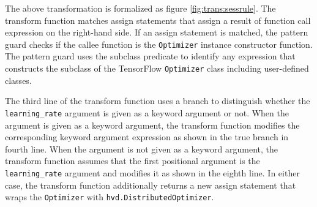 The above transformation is formalized as figure 
\ref{fig:trans:sessrule}. The transform function 
matches assign statements that assign a result of function call expression
on the right-hand side.
If an assign statement is matched, the pattern guard checks if the
callee function is the {\tt Optimizer} instance constructor function.
The pattern guard uses the subclass predicate \ktsubtysubs{\smodenv}
to identify any expression that constructs the subclass of the TensorFlow
{\tt Optimizer} class including user-defined classes.

The third line of the transform function uses a branch to distinguish 
whether the {\tt learning\_rate} argument is given as a keyword argument or not. 
When the argument is given as a keyword argument,
the transform function modifies the corresponding keyword argument expression
as shown in the true branch in fourth line.
When the argument is not given as a keyword argument,
the transform function assumes that the first positional argument
is the {\tt learning\_rate} argument and modifies it
as shown in the eighth line.
In either case, the transform function additionally returns a new
assign statement that wraps the {\tt Optimizer} with
{\tt hvd.DistributedOptimizer}.

